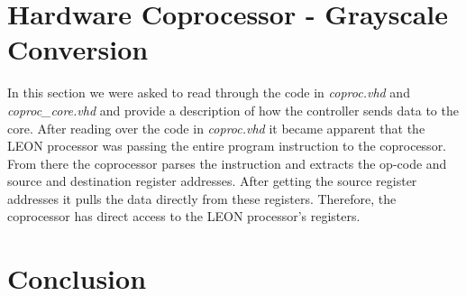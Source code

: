 \documentclass{article}
\begin{document}
\section{Hardware Coprocessor - Grayscale Conversion}
In this section we were asked to read through the code in \textit{coproc.vhd} and \textit{coproc\_core.vhd} and provide a description of how the controller sends data to the core. After reading over the code in \textit{coproc.vhd} it became apparent that the LEON processor was passing the entire program instruction to the coprocessor. From there the coprocessor parses the instruction and extracts the op-code and source and destination register addresses. After getting the source register addresses it pulls the data directly from these registers. Therefore, the coprocessor has direct access to the LEON processor's registers. 


\section{Conclusion}




%

%

\end{document}
